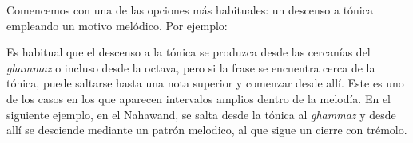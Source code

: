 Comencemos con una de las opciones más habituales: un descenso a tónica empleando un motivo melódico. Por ejemplo:

\begin{center}
\end{center}


Es habitual que el descenso a la tónica se produzca desde las cercanías del \emph{ghammaz} o incluso desde la octava, pero si la frase se encuentra cerca de la tónica, puede saltarse hasta una nota superior y comenzar desde allí. Este es uno de los casos en los que aparecen intervalos amplios dentro de la melodía. En el siguiente ejemplo, en el \maqam Nahawand, se salta desde la tónica al \emph{ghammaz} y desde allí se desciende mediante un patrón melodico, al que sigue un cierre con trémolo.

\begin{center}
\end{center}

